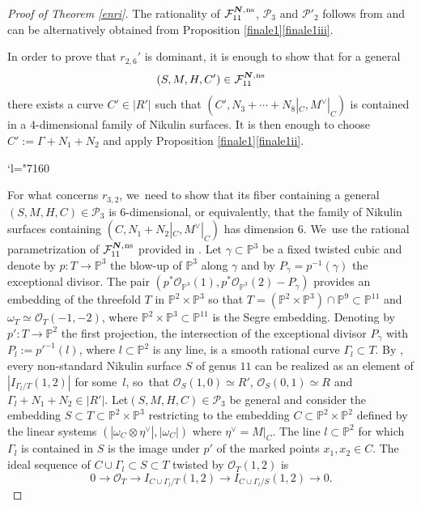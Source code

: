 \documentclass[11pt]{article}
\newcommand{\Changel}{\mathcode`l="7160}
\newcommand{\ns}{{\mkern1mu\mathrm{ns}}}
\newcommand{\bN}{\boldsymbol{N}}
\theoremstyle{plain}
\theoremstyle{definition}
\newcommand\PP{{\mathbb P}}
\newcommand\F{{\mathcal F}}
\renewcommand\O{{\mathcal O}}
\renewcommand\P{{\mathcal P}}
\begin{document}
\begin{proof}[Proof of Theorem \ref{enri}]
The rationality of $\F_{11}^{\bN,\ns}$, $\P_{3}$ and $\P'_{2}$ follows from \cite[Th.\,1.2]{KLV2} and can be alternatively obtained from Proposition \ref{finale1}\eqref{finale1iii}.

In order to prove that $r_{2,6}'$ is dominant, it is enough to show that for a general\vspace*{-3pt}
\[
(S,M,H,C')\in \F_{11}^{\bN,\ns}
\]
there exists a curve $C'\in |R'|$ such that $(C',N_3+\cdots+N_8|_C,M^\vee|_C)$ is contained in a $4$-dimensional family of Nikulin surfaces. It is then enough to choose $C':=\Gamma+N_1+N_2$ and apply Proposition \ref{finale1}\eqref{finale1ii}.

\Changel

For what concerns $r_{3,2}$, we~need to show that its fiber containing a general $(S,M,H,C)\in \P_{3}$ is $6$-dimensional, or equivalently, that the family of Nikulin surfaces containing $(C,N_1+N_2|_C,M^\vee|_C)$ has dimension $6$. We~use the rational parametrization of $\F_{11}^{\bN,\ns}$ provided in \cite[\S 5]{KLV2}. Let $\gamma\subset \PP^3$ be a fixed twisted cubic and denote by \hbox{$p:T\to \PP^3$} the blow-up of $\PP^3$ along $\gamma$ and by $P_\gamma=p^{-1}(\gamma)$ the exceptional divisor. The pair $(p^*\O_{\PP^3}(1), p^*\O_{\PP^3}(2)-P_\gamma)$ provides an embedding of the threefold $T$ in $\PP^2\times \PP^3$ so that $T=(\PP^2\times \PP^3)\cap \PP^9\subset \PP^{11}$ and $\omega_T\simeq \mathcal O_T(-1,-2)$, where $\PP^2\times \PP^3\subset\PP^{11}$ is the Segre embedding. Denoting by $p':T\to \PP^2$ the first projection, the intersection of the exceptional divisor $P_\gamma$ with $P_l:=p'^{-1}(l)$, where $l\subset\PP^2$ is any line, is a smooth rational curve $\Gamma_l\subset T$. By \cite[Lem.\,5.3]{KLV2}, every non-standard Nikulin surface $S$ of genus $11$ can be realized as an element of $|I_{\Gamma_l/T}(1,2)|$ for some~$l$, so~that $\O_S(1,0)\simeq R'$, $\O_S(0,1)\simeq R$ and $\Gamma_l+N_1+N_2\in |R'|$. Let$(S,M,H,C)\in \P_{3}$ be general and consider the embedding $ S\subset T\subset \PP^2\times \PP^3$ restricting to the embedding $C\subset \PP^2\times \PP^2$ defined by the linear systems $(|\omega_C\otimes \eta^\vee|, |\omega_C|)$ where $\eta^\vee=M|_C$. The line $l\subset \PP^2$ for which $\Gamma_l$ is contained in $S$ is the image under $p'$ of the marked points $x_1,x_2\in C$. The ideal sequence of $C\cup\Gamma_l\subset S\subset T$ twisted by $\O_T(1,2)$ is\vspace*{-3pt}
\[
0\to \O_T\to I_{C\cup \Gamma_l/T}(1,2)\to I_{C\cup \Gamma_l/S}(1,2)\to 0.
\]
\end{proof}
\end{document}
